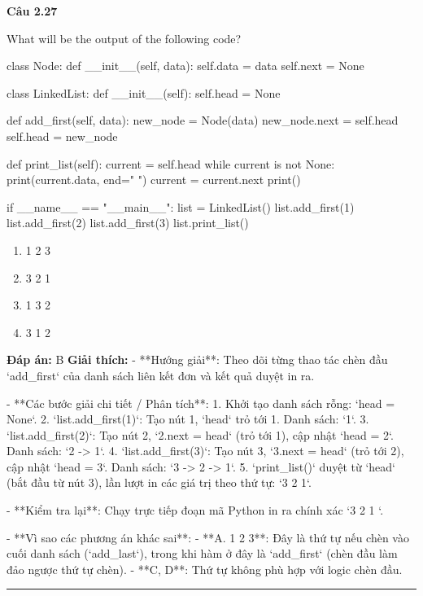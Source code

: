 \documentclass[11pt,a4paper]{article}
\newenvironment{question}[1]{%
  \par\vspace{1em}\noindent\textbf{\large Câu #1}\par\vspace{0.4em}
}{%
  \par\vspace{1em}\hrule\vspace{0.6em}
}
\newenvironment{choices}{%
  \begin{enumerate}[label=\textbf{\Alph*.},leftmargin=2.2em,itemsep=2pt,topsep=3pt]
}{%
  \end{enumerate}
}
\newcommand{\choice}{\item}
\newenvironment{codebox}{%
  \begin{tcolorbox}[colback=gray!8!white,colframe=gray!50!black,arc=1.5mm,boxrule=0.6pt,left=3mm,right=3mm,top=2.5mm,bottom=2.5mm]
  \ttfamily\small
}{%
  \end{tcolorbox}
}
\begin{document}
\begin{question}{2.27}
What will be the output of the following code?
\begin{codebox}
class Node:
    def __init__(self, data):
        self.data = data
        self.next = None

class LinkedList:
    def __init__(self):
        self.head = None

    def add_first(self, data):
        new_node = Node(data)
        new_node.next = self.head
        self.head = new_node

    def print_list(self):
        current = self.head
        while current is not None:
            print(current.data, end=" ")
            current = current.next
        print()

if __name__ == "__main__":
    list = LinkedList()
    list.add_first(1)
    list.add_first(2)
    list.add_first(3)
    list.print_list()
\end{codebox}
\begin{choices}
\choice 1 2 3
\choice 3 2 1
\choice 1 3 2
\choice 3 1 2
\end{choices}
\textbf{Đáp án:} B
\textbf{Giải thích:} - **Hướng giải**:
  Theo dõi từng thao tác chèn đầu `add_first` của danh sách liên kết đơn và kết quả duyệt in ra.

- **Các bước giải chi tiết / Phân tích**:
  1. Khởi tạo danh sách rỗng: `head = None`.
  2. `list.add_first(1)`: Tạo nút 1, `head` trỏ tới 1. Danh sách: `1`.
  3. `list.add_first(2)`: Tạo nút 2, `2.next = head` (trỏ tới 1), cập nhật `head = 2`. Danh sách: `2 -> 1`.
  4. `list.add_first(3)`: Tạo nút 3, `3.next = head` (trỏ tới 2), cập nhật `head = 3`. Danh sách: `3 -> 2 -> 1`.
  5. `print_list()` duyệt từ `head` (bắt đầu từ nút 3), lần lượt in các giá trị theo thứ tự: `3 2 1`.

- **Kiểm tra lại**:
  Chạy trực tiếp đoạn mã Python in ra chính xác `3 2 1 `.

- **Vì sao các phương án khác sai**:
  - **A. 1 2 3**: Đây là thứ tự nếu chèn vào cuối danh sách (`add_last`), trong khi hàm ở đây là `add_first` (chèn đầu làm đảo ngược thứ tự chèn).
  - **C, D**: Thứ tự không phù hợp với logic chèn đầu.
\end{question}
\end{document}
